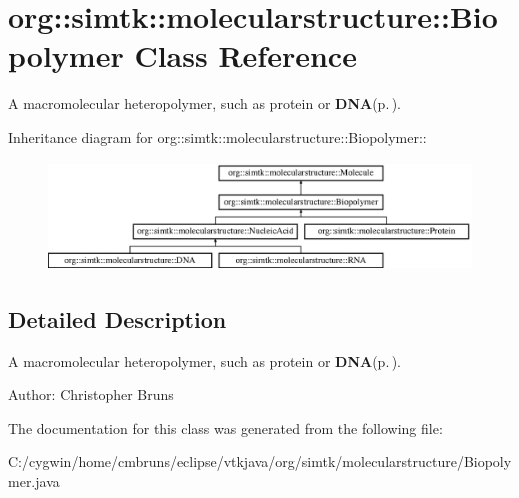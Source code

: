 \section{org::simtk::molecularstructure::Biopolymer Class Reference}
\label{classorg_1_1simtk_1_1molecularstructure_1_1_biopolymer}
A macromolecular heteropolymer, such as protein or {\bf DNA}{\rm (p.\,\pageref{classorg_1_1simtk_1_1molecularstructure_1_1_d_n_a})}.  


Inheritance diagram for org::simtk::molecularstructure::Biopolymer::\begin{figure}[H]
\begin{center}
\leavevmode
\includegraphics[height=2.89406cm]{classorg_1_1simtk_1_1molecularstructure_1_1_biopolymer}
\end{center}
\end{figure}


\subsection{Detailed Description}
A macromolecular heteropolymer, such as protein or {\bf DNA}{\rm (p.\,\pageref{classorg_1_1simtk_1_1molecularstructure_1_1_d_n_a})}. 

\begin{Desc}
\item[Author:]Christopher Bruns \end{Desc}




The documentation for this class was generated from the following file:\begin{CompactItemize}
\item 
C:/cygwin/home/cmbruns/eclipse/vtkjava/org/simtk/molecularstructure/Biopolymer.java\end{CompactItemize}
